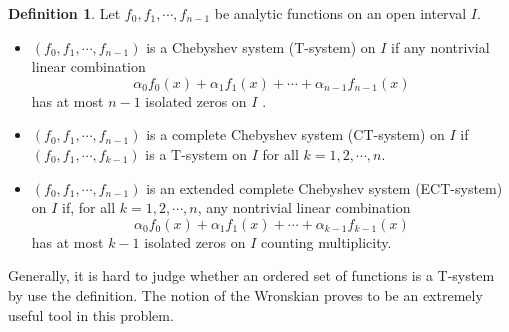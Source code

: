 \documentclass[11pt]{amsart}
\theoremstyle{remark}
\theoremstyle{definition}
\newtheorem{defn}[thm]{Definition}
\begin{document}
\begin{defn} Let $ f_0,  f_1,  \cdots,  f_{n-1}$  be analytic functions on an open interval $I$.



\begin{itemize}

\item[\textsc{(}a\textsc{)}] $ (f_0,  f_1,  \cdots,  f_{n-1})$  is a Chebyshev system (T-system) on $I$  if any nontrivial linear combination
$$\alpha_0f_0(x)+\alpha_1f_1(x)+\cdots+\alpha_{n-1}f_{n-1}(x)$$
has at most $n-1$ isolated zeros on $I$ .

\item[\textsc{(}b\textsc{)}] $ (f_0,  f_1,  \cdots,  f_{n-1})$  is a complete Chebyshev system (CT-system) on   $I$  if $ (f_0,  f_1,  \cdots,  f_{k-1})$
is a T-system on $I$ for all $k=1, 2, \cdots, n$.

\item[\textsc{(}c\textsc{)}] $ (f_0,  f_1,  \cdots,  f_{n-1})$  is an extended complete Chebyshev system (ECT-system) on $I$ if, for all $k=1, 2, \cdots, n$, any nontrivial linear combination
$$\alpha_0f_0(x)+\alpha_1f_1(x)+\cdots+\alpha_{k-1}f_{k-1}(x)$$
has at most $k-1$ isolated zeros on $I$ counting multiplicity.

\end{itemize}

Generally, it is hard to judge  whether   an   ordered set of functions is
a T-system by use the definition.  The notion of the Wronskian proves to be an extremely useful tool in this problem.


\end{defn}
\end{document}

